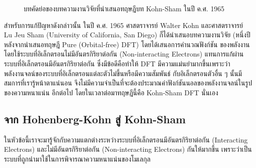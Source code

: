 \begin{figure}[H]
    \centering
    \caption{บทคัดย่อของบทความงานวิจัยที่นำเสนอทฤษฎีบท Kohn-Sham ในปี ค.ศ. 1965}
    \label{fig:kohn_sham_abs}
\end{figure}

สำหรับการแก้ปัญหาดังกล่าวนั้น ในปี ค.ศ. 1965 ศาสตราจารย์ Walter Kohn และศาสตราจารย์ Lu Jeu Sham (University of California,
San Diego) ก็ได้นำเสนอบทความงานวิจัย (หนึ่งปีหลังจากนำเสนอทฤษฎี Pure (Orbital-free) DFT) โดยได้เสนอการคำนวณฟังก์ชัน%
ของพลังงานโดยใช้ระบบที่อิเล็กตรอนไม่มีอันตรกิริยาต่อกัน (Non-interacting Electrons) แทนการแก้ผ่านระบบที่อิเล็กตรอนมีอันตรกิริยาต่อกัน%
\autocite{kohn1965} ซึ่งมีข้อดีคือทำให้ DFT มีความแม่นยำมากขึ้นเพราะว่าพลังงานจลน์ของระบบที่อิเล็กตรอนแต่ละตัวไม่ขึ้นหรือมีความสัมพันธ์%
กับอิเล็กตรอนตัวอื่น ๆ นั้นมีสมการที่เรารู้หน้าตาแน่นอน จึงไม่มีความจำเป็นที่จะต้องประมาณค่าฟังก์ชันนอลของพลังงานจลน์ในรูปของความหนาแน่น%
อีกต่อไป โดยในเวลาต่อมาทฤษฎีนี้คือ Kohn-Sham DFT นั่นเอง

\subsection{จาก Hohenberg-Kohn สู่ Kohn-Sham}
\label{ssec:from_hk_to_ks}

ในหัวข้อนี้เราจะมารู้จักกับความแตกต่างระหว่างระบบที่อิเล็กตรอนมีอันตรกิริยาต่อกัน (Interacting Electrons) และไม่มีอันตรกิริยาต่อกัน
(Non-interacting Electrons) กันให้มากขึ้น เพราะว่าเป็นระบบที่ถูกนำมาใช้ในการพิจารณาความหนาแน่นของโมเลกุล

